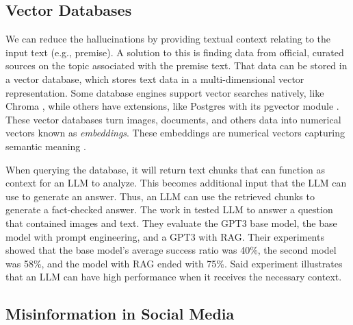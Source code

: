 \subsection{Vector Databases}
We can reduce the hallucinations by providing textual context relating to the input text (e.g., premise). A solution to this is finding data from official, curated sources  on the topic associated with the premise text. That data can be stored
in a vector database, which stores text data in a multi-dimensional vector representation.  Some database  engines support vector searches natively, like Chroma \cite{chroma}, while others have extensions,
like Postgres with its pgvector  module \cite{pgvector}. These vector databases turn images, documents, and others data into numerical vectors known as {\em embeddings}. These embeddings are numerical vectors capturing semantic meaning \cite{10455990}.
 
When querying the database, it will return text chunks that can function as context for an LLM to analyze. This becomes additional input that the LLM can use to generate an answer. Thus, an LLM can use the retrieved chunks to generate a fact-checked answer. %
 The work in \cite{10683437}  tested LLM to answer a question that contained images and text. They evaluate the GPT3 base model, the base model with prompt engineering,
and a GPT3 with RAG. Their experiments showed that the base model's average success ratio was 40\%, the second model was 58\%, and the model with RAG ended with 75\%. Said experiment illustrates  that
an LLM can have high performance when it receives the necessary context. 

\subsection{Misinformation in Social Media}

